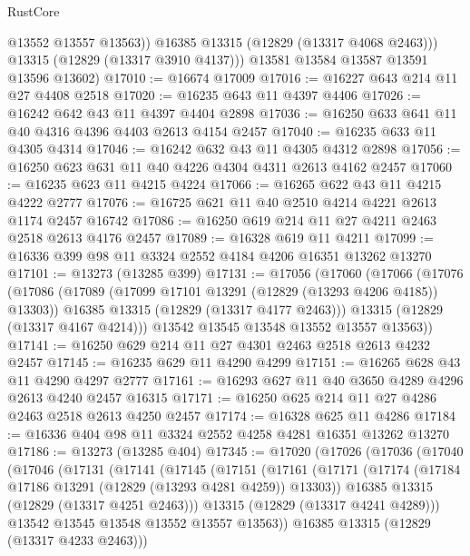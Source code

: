 \begin{lexlean}{RustCore}
\begin{coremodule}
              @13552
              @13557
              @13563))
          @16385
          @13315
          (@12829 (@13317 @4068 @2463)))
        @13315
        (@12829 (@13317 @3910 @4137)))
      @13581
      @13584
      @13587
      @13591
      @13596
      @13602)
@17010 := @16674 @17009
@17016 := @16227 @643 @214 @11 @27 @4408 @2518
@17020 := @16235 @643 @11 @4397 @4406
@17026 := @16242 @642 @43 @11 @4397 @4404 @2898
@17036 := @16250 @633 @641 @11 @40 @4316 @4396 @4403 @2613 @4154 @2457
@17040 := @16235 @633 @11 @4305 @4314
@17046 := @16242 @632 @43 @11 @4305 @4312 @2898
@17056 := @16250 @623 @631 @11 @40 @4226 @4304 @4311 @2613 @4162 @2457
@17060 := @16235 @623 @11 @4215 @4224
@17066 := @16265 @622 @43 @11 @4215 @4222 @2777
@17076 := @16725 @621 @11 @40 @2510 @4214 @4221 @2613 @1174 @2457 @16742
@17086 := @16250 @619 @214 @11 @27 @4211 @2463 @2518 @2613 @4176 @2457
@17089 := @16328 @619 @11 @4211
@17099 := @16336 @399 @98 @11 @3324 @2552 @4184 @4206 @16351 @13262 @13270
@17101 := @13273 (@13285 @399)
@17131 := @17056
    (@17060
      (@17066
        (@17076
          (@17086
            (@17089 (@17099 @17101 @13291 (@12829 (@13293 @4206 @4185)) @13303))
            @16385
            @13315
            (@12829 (@13317 @4177 @2463)))
          @13315
          (@12829 (@13317 @4167 @4214)))
        @13542
        @13545
        @13548
        @13552
        @13557
        @13563))
@17141 := @16250 @629 @214 @11 @27 @4301 @2463 @2518 @2613 @4232 @2457
@17145 := @16235 @629 @11 @4290 @4299
@17151 := @16265 @628 @43 @11 @4290 @4297 @2777
@17161 := @16293 @627 @11 @40 @3650 @4289 @4296 @2613 @4240 @2457 @16315
@17171 := @16250 @625 @214 @11 @27 @4286 @2463 @2518 @2613 @4250 @2457
@17174 := @16328 @625 @11 @4286
@17184 := @16336 @404 @98 @11 @3324 @2552 @4258 @4281 @16351 @13262 @13270
@17186 := @13273 (@13285 @404)
@17345 := @17020
    (@17026
      (@17036
        (@17040
          (@17046
            (@17131
              (@17141
                (@17145
                  (@17151
                    (@17161
                      (@17171
                        (@17174 (@17184 @17186 @13291 (@12829 (@13293 @4281 @4259)) @13303))
                        @16385
                        @13315
                        (@12829 (@13317 @4251 @2463)))
                      @13315
                      (@12829 (@13317 @4241 @4289)))
                    @13542
                    @13545
                    @13548
                    @13552
                    @13557
                    @13563))
                @16385
                @13315
                (@12829 (@13317 @4233 @2463)))

\end{coremodule}
\end{lexlean}
